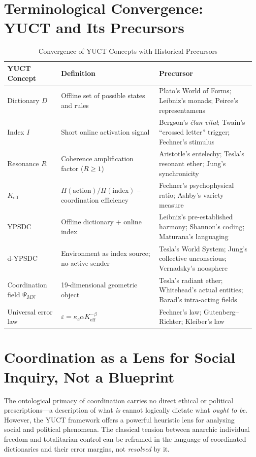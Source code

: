 \documentclass[12pt,a4paper]{article}
\begin{document}
	\section{Terminological Convergence: YUCT and Its Precursors}
	
	\begin{table}[htbp]
		\centering
		\caption{Convergence of YUCT Concepts with Historical Precursors}
		\label{tab:convergence}
		\small
		\begin{tabular}{p{2.5cm}p{4.5cm}p{4.5cm}}
			\toprule
			\textbf{YUCT Concept} & \textbf{Definition} & \textbf{Precursor} \\
			\midrule
			Dictionary \(D\) & Offline set of possible states and rules & Plato's World of Forms; Leibniz's monads; Peirce's representamens \\
			Index \(I\) & Short online activation signal & Bergson's \emph{élan vital}; Twain's ``crossed letter'' trigger; Fechner's stimulus \\
			Resonance \(R\) & Coherence amplification factor (\(R \ge 1\)) & Aristotle's entelechy; Tesla's resonant ether; Jung's synchronicity \\
			\(K_{\mathrm{eff}}\) & \(H(\text{action})/H(\text{index})\) -- coordination efficiency & Fechner's psychophysical ratio; Ashby's variety measure \\
			YPSDC & Offline dictionary + online index & Leibniz's pre-established harmony; Shannon's coding; Maturana's languaging \\
			d-YPSDC & Environment as index source; no active sender & Tesla's World System; Jung's collective unconscious; Vernadsky's noosphere \\
			Coordination field \(\Psi_{MN}\) & 19-dimensional geometric object & Tesla's radiant ether; Whitehead's actual entities; Barad's intra-acting fields \\
			Universal error law & \(\varepsilon = \kappa_c \alpha K_{\mathrm{eff}}^{-\beta}\) & Fechner's law; Gutenberg–Richter; Kleiber's law \\
			\bottomrule
		\end{tabular}
	\end{table}
	
	\section{Coordination as a Lens for Social Inquiry, Not a Blueprint}
	\label{sec:social-lens}
	
	The ontological primacy of coordination carries no direct ethical or political prescriptions---a description of what \emph{is} cannot logically dictate what \emph{ought to be}. However, the YUCT framework offers a powerful heuristic lens for analysing social and political phenomena. The classical tension between anarchic individual freedom and totalitarian control can be reframed in the language of coordinated dictionaries and their error margins, not \emph{resolved} by it.
	
\end{document}
